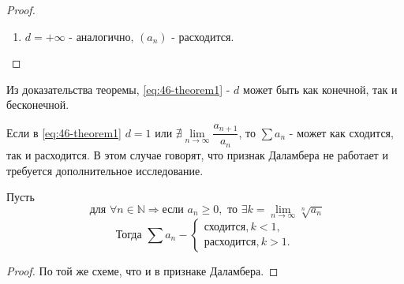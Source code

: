 \begin{proof}
\begin{enumerate}
\begin{equation*}
			\begin{split}
				&\varepsilon_0 = \dfrac{\abs{1 - d}}{2} = \dfrac{d - 1}{2} > 0\\
				&\text{ для }\forall n \geqslant m, \dfrac{a_{n + 1}}{a_n} \geqslant d - \dfrac{d - 1}{2} = \dfrac{1 + d}{2} > 1
			\end{split}
		\end{equation*}
		Т.е. $a_{n + 1} > a_n, \text{ для } \forall n \geqslant m$. Значит в рассматриваемом случае положительного ряда $(a_n)$ есть возрастающий остаток.
		А тогда $\lim\limits_{n \to \infty}a_n \neq 0$, т.е. $\sum a_n$ - расходится.
	  \item $d = +\infty$ - аналогично, $(a_n)$ - расходится.
	\end{enumerate}
\end{proof}
\begin{notes}
  \item Из доказательства теоремы, \eqref{eq:46-theorem1} - $d$ может быть как конечной, так и бесконечной.
  \item Если в \eqref{eq:46-theorem1} $d = 1$ или $\nexists \lim\limits_{n \to \infty}\dfrac{a_{n + 1}}{a_n}$, то
	$\sum a_n$ - может как сходится, так и расходится. В этом случае говорят, что признак Даламбера не работает и требуется
	дополнительное исследование.
\end{notes}
\begin{theorem}
	Пусть
	\begin{equation}
		\label{eq:46-theorem2}
		\text{ для }\forall n \in \mathbb{N} \Rightarrow \text{если } a_n \geqslant 0, \text{ то } \exists k = \lim\limits_{n \to \infty}\sqrt[n]{a_n}
	\end{equation}
	\begin{equation}
		\label{eq:46-theoremmain2}
		\text{Тогда } \sum a_n -
		\begin{cases}
			\text{сходится}, k < 1,\\
			\text{расходится}, k > 1.
		\end{cases}
	\end{equation}
\end{theorem}
\begin{proof}
	По той же схеме, что и в признаке Даламбера.
\end{proof}
